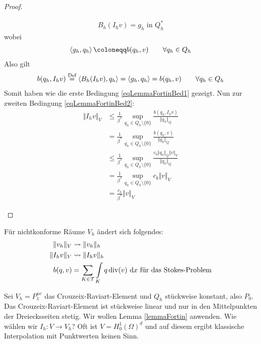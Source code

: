 \begin{proof}
\begin{enumerate}[label=(\roman*)]
\begin{align*}
			B_h(I_h v)=g_h\text{ in }Q_h^\ast
		\end{align*}
		wobei
		\begin{align*}
			\dualpair{g_h}{q_h} \coloneqq b(q_h,v)\qquad\forall q_h\in Q_h
		\end{align*}
		Also gilt
		\begin{align*}
			b(q_h,I_h v)
			\overset{\text{Def}}=
			\left\langle B_h(I_h v), q_h \right\rangle
			=\left\langle g_h, q_h \right\rangle
			=b(q_h,v)\qquad\forall q_h\in Q_h
		\end{align*}
		Somit haben wie die erste Bedingung \eqref{eqLemmaFortinBed1} gezeigt.
		Nun zur zweiten Bedingung \eqref{eqLemmaFortinBed2}:
		\begin{align*}
			\Vert I_h v\Vert_V
			&\leq \frac{1}{\beta^\ast}\sup_{q_h\in Q_h\setminus\{0\}}\frac{b(q_h,I_h v)}{\Vert q_h\Vert_Q}\\
			&=\frac{1}{\beta^\ast}\sup_{q_h\in Q_h\setminus\{0\}}\frac{b(q_h,v)}{\Vert q_h\Vert_Q}\\
			&\leq\frac{1}{\beta^\ast}\sup_{q_h\in Q_h\setminus\{0\}}\frac{c_b\Vert q_h\Vert_{Q}\Vert v\Vert_V}{\Vert q_h\Vert_Q}\\
			&=\frac{1}{\beta^\ast}\sup_{q_h\in Q_h\setminus\{0\}}c_b\Vert v\Vert_V\\
			&=\frac{c_b}{\beta^\ast}\Vert v\Vert_V
		\end{align*}
	\end{enumerate}
\end{proof}

\begin{bemerkung}
	Für nichtkonforme Räume $V_h$ ändert sich folgendes:
	\begin{align*}
		\Vert v_h\Vert_V&\leadsto\Vert v_h\Vert_h\\
		\Vert I_h v\Vert_V&\leadsto\Vert I_h v\Vert_h\\
		b(q,v)&=\sum\limits_{K\in\mathcal{T}}\int\limits_K q\operatorname{div}(v)\text{ d} x \text{ für das Stokes-Problem}
	\end{align*}
\end{bemerkung}

Sei $V_h = P_1^{nc}$ das Crouzeix-Raviart-Element und $Q_h$ stückweise konstant, also $P_0$. %
Das Crouzeix-Raviart-Element ist stückweise linear und nur in den Mittelpunkten der Dreiecksseiten stetig.
Wir wollen Lemma \ref{lemmaFortin} anwenden.
Wie wählen wir $I_h\colon V\to V_h$? Oft ist $V = H^1_0(\Omega)^d$ und auf diesem ergibt klassische Interpolation mit Punktwerten keinen Sinn. %

